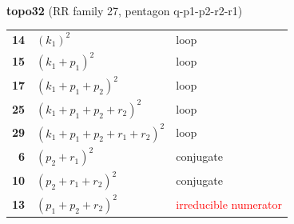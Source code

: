 \documentclass[10pt]{article}
\begin{document}
\begin{minipage}[t]{0.48\textwidth}
{}\\[2mm]\textbf{topo32} (RR family 27, pentagon q-p1-p2-r2-r1)\\[2pt]{\footnotesize\begin{tabular}{@{}r@{\ \ }l@{\ \ }l@{}}\textbf{14} & $(k_1)^2$ & loop\\
\textbf{15} & $(k_1+p_1)^2$ & loop\\
\textbf{17} & $(k_1+p_1+p_2)^2$ & loop\\
\textbf{25} & $(k_1+p_1+p_2+r_2)^2$ & loop\\
\textbf{29} & $(k_1+p_1+p_2+r_1+r_2)^2$ & loop\\
\textbf{6} & $(p_2+r_1)^2$ & conjugate\\
\textbf{10} & $(p_2+r_1+r_2)^2$ & conjugate\\
\textbf{13} & $(p_1+p_2+r_2)^2$ & \textcolor{red}{irreducible numerator}\\\end{tabular}}\end{minipage}

\bigskip
\end{document}
